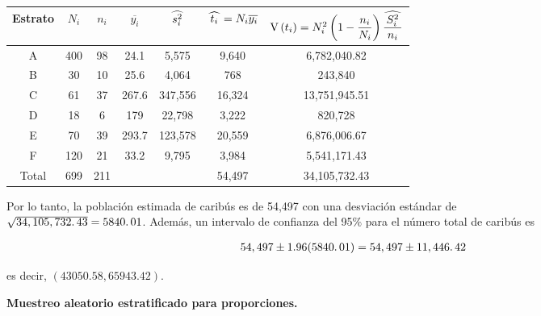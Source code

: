 \documentclass[12pt, fleqn]{article}
\newcommand{\gorro}[1]{\widehat{\hspace{0.7mm} #1 \hspace{0.7mm}}}
\newcommand{\V}[1]{\mathrm{V} \left( #1 \right)}
\begin{document}
    \begin{table}[h]
        \begin{tabular}{|c|c|c|c|c|c|c|}
            \hline
            Estrato & $N_i$ & $n_i$ & $\overline{y_i}$ & $\gorro{s_i^2}$ & $\gorro{t_i} = N_i \overline{y_i}$ & $\V{t_i} = N_i^2 \left( 1 - \dfrac{n_i}{N_i} \right) \dfrac{\gorro{S_i^2}}{n_i}$ \\
            \hline
            A       & 400   & 98    & 24.1             & 5,575           & 9,640                              & 6,782,040.82 \\
            \hline
            B       & 30    & 10    & 25.6             & 4,064           & 768                                & 243,840 \\
            \hline
            C       & 61    & 37    & 267.6            & 347,556         & 16,324                             & 13,751,945.51 \\
            \hline
            D       & 18    & 6     & 179              & 22,798          & 3,222                              & 820,728 \\
            \hline
            E       & 70    & 39    & 293.7            & 123,578         & 20,559                             & 6,876,006.67 \\
            \hline
            F       & 120   & 21    & 33.2             & 9,795           & 3,984                              & 5,541,171.43 \\
            \hline
            Total   & 699   & 211   &                  &                 & 54,497                             & 34,105,732.43 \\
            \hline
        \end{tabular}
    \end{table}

    Por lo tanto, la población estimada de caribús es de 54,497 con una desviación estándar de \\ $ \sqrt{34,105,732 \ldotp 43} = 5840 \ldotp 01 $. Además, un intervalo de confianza del 95$\%$ para el número total de caribús es 

    \begin{align*}
        54,497 \pm 1.96(5840 \ldotp 01) = 54,497 \pm 11,446 \ldotp 42
    \end{align*}

    es decir, $ \left( 43050.58, 65943.42 \right) $.

    \textbf{Muestreo aleatorio estratificado para proporciones.}
\end{document}
